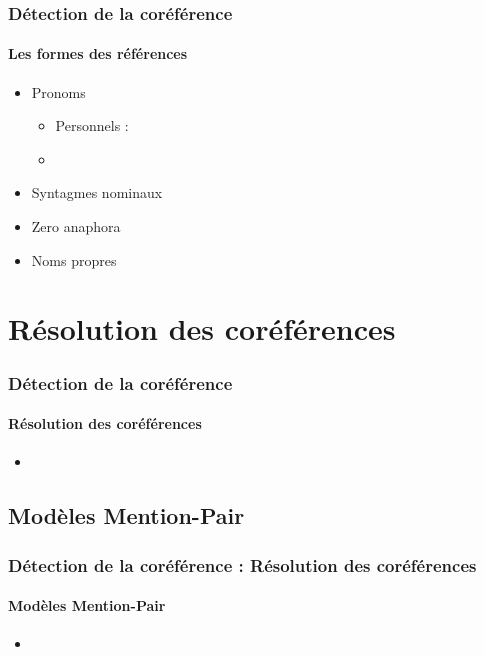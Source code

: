\documentclass[xcolor=table]{beamer}
\begin{document}
\begin{frame}
\frametitle{Détection de la coréférence}
\framesubtitle{Les formes des références}
	
	\begin{itemize}
		\item Pronoms
		\begin{itemize}
			\item Personnels : 
			\item 
		\end{itemize}
		\item Syntagmes nominaux
		\item Zero anaphora
		\item Noms propres
	\end{itemize}
	
\end{frame}

\section{Résolution des coréférences}

\begin{frame}
	\frametitle{Détection de la coréférence}
	\framesubtitle{Résolution des coréférences}
	
	\begin{itemize}
		\item 
	\end{itemize}
	
\end{frame}


\subsection{Modèles Mention-Pair}

\begin{frame}
	\frametitle{Détection de la coréférence : Résolution des coréférences}
	\framesubtitle{Modèles Mention-Pair}
	
	\begin{itemize}
		\item 
	\end{itemize}
	
\end{frame}
\end{document}

